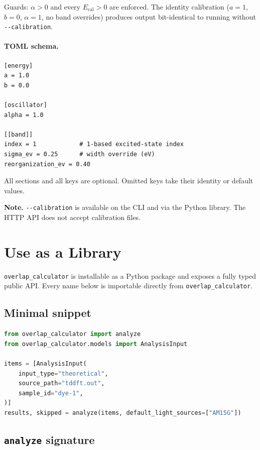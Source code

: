 \documentclass[11pt,a4paper]{article}
\begin{document}
\noindent Guards: \(\alpha > 0\) and every \(E_{\text{cal}} > 0\) are
enforced. The identity calibration (\(a=1\), \(b=0\), \(\alpha=1\), no
band overrides) produces output bit-identical to running without
\texttt{-{}-calibration}.

\paragraph{TOML schema.}
\begin{lstlisting}
[energy]
a = 1.0
b = 0.0

[oscillator]
alpha = 1.0

[[band]]
index = 1            # 1-based excited-state index
sigma_ev = 0.25      # width override (eV)
reorganization_ev = 0.40
\end{lstlisting}

All sections and all keys are optional. Omitted keys take their identity
or default values.

\medskip
\noindent\textbf{Note.} \texttt{-{}-calibration} is available on the CLI
and via the Python library. The HTTP API does not accept calibration files.

\section{Use as a Library}
\label{sec:library}

\texttt{overlap\_calculator} is installable as a Python package and
exposes a fully typed public API. Every name below is importable directly
from \texttt{overlap\_calculator}.

\subsection*{Minimal snippet}

\begin{lstlisting}[language=Python]
from overlap_calculator import analyze
from overlap_calculator.models import AnalysisInput

items = [AnalysisInput(
    input_type="theoretical",
    source_path="tddft.out",
    sample_id="dye-1",
)]
results, skipped = analyze(items, default_light_sources=["AM15G"])
\end{lstlisting}

\subsection*{\texttt{analyze} signature}
\end{document}
